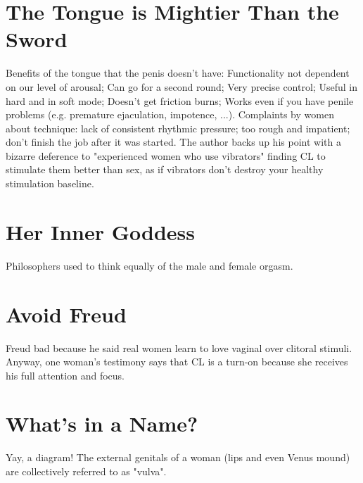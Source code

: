 \section{The Tongue is Mightier Than the Sword}
\begin{outline}
\1 Benefits of the tongue that the penis doesn't have:
	\2 Functionality not dependent on our level of arousal;
	\2 Can go for a second round;
	\2 Very precise control;
	\2 Useful in hard and in soft mode;
	\2 Doesn't get friction burns;
	\2 Works even if you have penile problems (e.g. premature ejaculation, impotence, ...).
\1 Complaints by women about technique: lack of consistent rhythmic pressure; too rough and impatient; don't finish the job after it was started.
\1 The author backs up his point with a bizarre deference to "experienced women who use vibrators" finding CL to stimulate them better than sex, as if vibrators don't destroy your healthy stimulation baseline.
\end{outline}

\section{Her Inner Goddess}
\begin{outline}
\1 Philosophers used to think equally of the male and female orgasm.
\end{outline}

\section{Avoid Freud}
\begin{outline}
\1 Freud bad because he said real women learn to love vaginal over clitoral stimuli.
\1 Anyway, one woman's testimony says that CL is a turn-on because she receives his full attention and focus.
\end{outline}

\section{What's in a Name?}
\begin{outline}
\1 Yay, a diagram!
\1 The external genitals of a woman (lips and even Venus mound) are collectively referred to as "vulva".
\end{outline}


